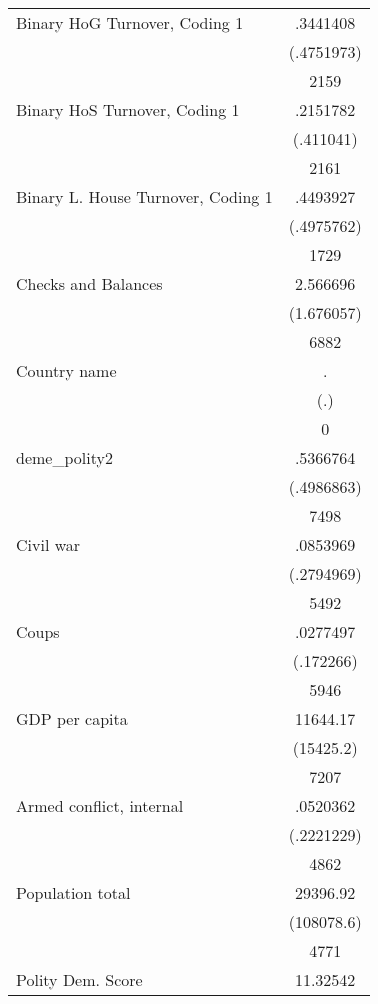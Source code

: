 {\begin{longtable}{l*{1}{c}}
Binary HoG Turnover, Coding 1&    .3441408\\
                    &  (.4751973)\\
                    &        2159\\
Binary HoS Turnover, Coding 1&    .2151782\\
                    &   (.411041)\\
                    &        2161\\
Binary L. House Turnover, Coding 1&    .4493927\\
                    &  (.4975762)\\
                    &        1729\\
Checks and Balances &    2.566696\\
                    &  (1.676057)\\
                    &        6882\\
Country name        &           .\\
                    &         (.)\\
                    &           0\\
deme\_polity2        &    .5366764\\
                    &  (.4986863)\\
                    &        7498\\
Civil war           &    .0853969\\
                    &  (.2794969)\\
                    &        5492\\
Coups               &    .0277497\\
                    &   (.172266)\\
                    &        5946\\
GDP per capita      &    11644.17\\
                    &   (15425.2)\\
                    &        7207\\
Armed conflict, internal&    .0520362\\
                    &  (.2221229)\\
                    &        4862\\
Population total    &    29396.92\\
                    &  (108078.6)\\
                    &        4771\\
Polity Dem. Score   &    11.32542\\

\end{longtable}}
